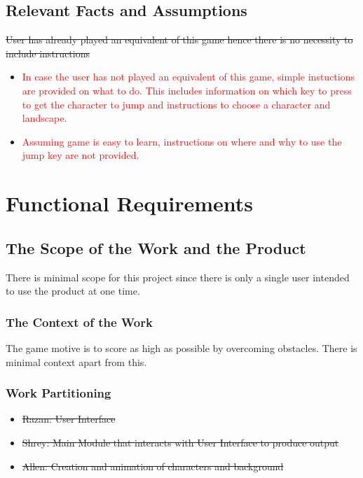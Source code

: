 \documentclass[12pt, titlepage]{article}
\begin{document}
\subsection{Relevant Facts and Assumptions}
\sout{User has already played an equivalent of this game hence there is no necessity to include instructions}
\begin{itemize}
\item{\textcolor{red}{In case the user has not played an equivalent of this game, simple instuctions are provided on what to do. This includes information on which key to press to get the character to jump and instructions to choose a character and landscape.}}
\item{\textcolor{red}{Assuming game is easy to learn, instructions on where and why to use the jump key are not provided.}}
\end{itemize}

\section{Functional Requirements}

\subsection{The Scope of the Work and the Product}
There is minimal scope for this project since there is only a single user intended to use the product at one time. \\ 

\subsubsection{The Context of the Work}
The game motive is to score as high as possible by overcoming obstacles. There is minimal context apart from this.\\

\subsubsection{Work Partitioning}

\begin{itemize}
\item \sout{Razan: User Interface}
\item \sout{Shrey: Main Module that interacts with User Interface to produce output}
\item \sout{Allen: Creation and animation of characters and background}
\end{itemize}
\end{document}
